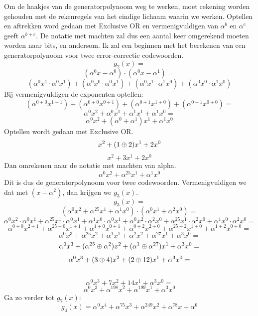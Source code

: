 \documentclass[a4paper]{article}
\begin{document}
Om de haakjes van de generatorpolynoom weg te werken, moet rekening worden gehouden met de rekenregels van het eindige lichaam waarin we werken. Optellen en aftrekken word gedaan met Exclusive OR en vermenigvuldigen van $\alpha^b$ en $\alpha^c$ geeft $\alpha^{b+c}$. De notatie met machten zal dus een aantal keer omgerekend moeten worden naar bits, en andersom. Ik zal een beginnen met het berekenen van een generatorpolynoom voor twee error-correctie codewoorden.
$$g_2(x)=$$
$$(\alpha^0x - \alpha^0) \cdot (\alpha^0x - \alpha^1)=$$
$$(\alpha^0x^1 \cdot \alpha^0x^1) + (\alpha^0x^0 \cdot \alpha^0x^1) + (\alpha^0x^1 \cdot \alpha^1x^0) + (\alpha^0x^0 \cdot \alpha^1x^0)$$
Bij vermenigvuldigen de exponenten optellen:
$$(\alpha^{0+0}x^{1+1}) + (\alpha^{0+0}x^{0+1}) + (\alpha^{0+1}x^{1+0}) + (\alpha^{0+1}x^{0+0})=$$
$$\alpha^0x^2 + \alpha^0x^1 + \alpha^1x^1 + \alpha^1x^0=$$
$$\alpha^0x^2 + (\alpha^0+\alpha^1)x^1 + \alpha^1x^0$$
Optellen wordt gedaan met Exclusive OR.
$$x^2 + (1\mathbin{\oplus}2)x^1 + 2x^0$$
$$x^2 + 3x^1 + 2x^0$$
Dan omrekenen naar de notatie met machten van alpha.
$$\alpha^0x^2 + \alpha^{25}x^1 + \alpha^1x^0$$
Dit is dus de generatorpolynoom voor twee codewoorden. Vermenigvuldigen we dat met $(x-\alpha^2)$, dan krijgen we $g_3(x)$.
$$g_3(x)=$$
$$(\alpha^0x^2 + \alpha^{25}x^1 + \alpha^1x^0) \cdot (\alpha^0x^1 + \alpha^2x^0)=$$
$$\alpha^0x^2 \cdot \alpha^0x^1 + \alpha^{25}x^1 \cdot \alpha^0x^1 + \alpha^1x^0 \cdot \alpha^0x^1 + \alpha^0x^2 \cdot \alpha^2x^0 + \alpha^25x^1 \cdot \alpha^2x^0 + \alpha^1x^0 \cdot \alpha^2x^0=$$
$$\alpha^{0+0}x^{2+1} + \alpha^{25+0}x^{1+1} + \alpha^{1+0}x^{0+1} + \alpha^{0+2}x^{2+0} + \alpha^{25+2}x^{1+0} + \alpha^{1+2}x^{0+0}=$$
$$\alpha^0x^3 + \alpha^{25}x^2 + \alpha^1x^1 + \alpha^2x^2 + \alpha^{27}x^1 + \alpha^3x^0=$$
$$\alpha^0x^3 + (\alpha^{25} \mathbin{\oplus} \alpha^2)x^2 + (\alpha^1 \mathbin{\oplus} \alpha^{27})x^1 + \alpha^3x^0=$$
$$\alpha^0x^3 + (3 \mathbin{\oplus} 4)x^2 + (2 \mathbin{\oplus} 12)x^1 + \alpha^3x^0=$$
\\
$$\alpha^0x^3 + 7x^2 + 14x^1 + \alpha^3x^0=$$
$$\alpha^0x^3 + \alpha^{198}x^2 + \alpha^{199}x^1 + \alpha^3x^0$$
Ga zo verder tot $g_7(x)$:
$$g_4(x)=\alpha^{0}x^{4}+\alpha^{75}x^{3}+\alpha^{249}x^{2}+\alpha^{78}x+\alpha^{6}$$
\end{document}
